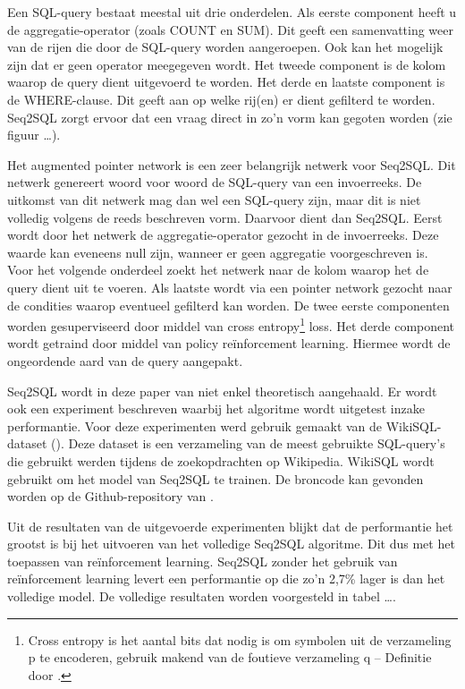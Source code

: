Een SQL-query bestaat meestal uit drie onderdelen. Als eerste component heeft u de aggregatie-operator (zoals COUNT en SUM). Dit geeft een samenvatting weer van de rijen die door de SQL-query worden aangeroepen. Ook kan het mogelijk zijn dat er geen operator meegegeven wordt. Het tweede component is de kolom waarop de query dient uitgevoerd te worden. Het derde en laatste component is de WHERE-clause. Dit geeft aan op welke rij(en) er dient gefilterd te worden. Seq2SQL zorgt ervoor dat een vraag direct in zo’n vorm kan gegoten worden (zie figuur …).

Het augmented pointer network is een zeer belangrijk netwerk voor Seq2SQL. Dit netwerk genereert woord voor woord de SQL-query van een invoerreeks. De uitkomst van dit netwerk mag dan wel een SQL-query zijn, maar dit is niet volledig volgens de reeds beschreven vorm. Daarvoor dient dan Seq2SQL. Eerst wordt door het netwerk de aggregatie-operator gezocht in de invoerreeks. Deze waarde kan eveneens null zijn, wanneer er geen aggregatie voorgeschreven is. Voor het volgende onderdeel zoekt het netwerk naar de kolom waarop het de query dient uit te voeren. Als laatste wordt via een pointer network gezocht naar de condities waarop eventueel gefilterd kan worden. De twee eerste componenten worden gesuperviseerd door middel van cross entropy\footnote{Cross entropy is het aantal bits dat nodig is om symbolen uit de verzameling p te encoderen, gebruik makend van de foutieve verzameling q – Definitie door \textcite{rdp}.} loss. Het derde component wordt getraind door middel van policy reïnforcement learning. Hiermee wordt de ongeordende aard van de query aangepakt.

Seq2SQL wordt in deze paper van \textcite{seq2sqlPaper} niet enkel theoretisch aangehaald. Er wordt ook een experiment beschreven waarbij het algoritme wordt uitgetest inzake performantie.  Voor deze experimenten werd gebruik gemaakt van de WikiSQL-dataset (\textcite{wikisql}). Deze dataset is een verzameling van de meest gebruikte SQL-query’s die gebruikt werden tijdens de zoekopdrachten op Wikipedia. WikiSQL wordt gebruikt om het model van Seq2SQL te trainen. De broncode kan gevonden worden op de Github-repository van \textcite{seq2sql}.

Uit de resultaten van de uitgevoerde experimenten blijkt dat de performantie het grootst is bij het uitvoeren van het volledige Seq2SQL algoritme. Dit dus met het toepassen van reïnforcement learning. Seq2SQL zonder het gebruik van reïnforcement learning levert een performantie op die zo’n 2,7\% lager is dan het volledige model. De volledige resultaten worden voorgesteld in tabel …. 

